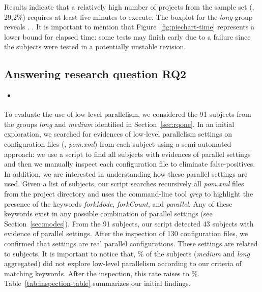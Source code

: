 Results indicate that a relatively high number of projects from the
sample set (\ie, 29,2\%) requires at least five minutes to execute.
The boxplot for the \emph{long} group reveals . .  It is important to mention that
Figure~\ref{fig:piechart-time} represents a lower bound for elapsed
time: some tests may finish early due to a failure since the subjects
were tested in a potentially unstable revision.

\subsection{Answering research question RQ2}
\label{sec:rqTwo}

\begin{itemize}
    \item \emph{\RQB}
\end{itemize}

To evaluate the  use of low-level parallelism, we considered the 91
subjects from the groups \emph{long} and \emph{medium} identified in
Section~\ref{sec:rqone}. In an initial exploration, we searched for
evidences of low-level parallelism settings on configuration files
(\ie, \emph{pom.xml}) from each subject using a semi-automated
approach: we use a script to find all subjects with evidences of
parallel settings and then we manually inspect each configuration file
to eliminate false-positives. In addition, we are interested in
understanding how these parallel settings are used. Given a list of
subjects, our script searches recursively all \emph{pom.xml} files
from the project directory and uses the command-line tool \emph{grep}
to highlight the presence of the keywords \emph{forkMode},
\emph{forkCount}, and \emph{parallel}.  Any of these keywords exist in
any possible combination of parallel settings (see
Section~\ref{sec:modes}). From the 91 subjects, our script detected 43
subjects with evidence of parallel settings. After the inspection of
130 configuration files, we confirmed that  settings are real
parallel configurations.  These settings are related to 
subjects. It is important to notice that, \% of the subjects
(\emph{medium} and \emph{long} aggregated) did not explore low-level
parallelism according to our criteria of matching keywords. After the
inspection, this rate raises to \%. 
Table~\ref{tab:inspection-table} summarizes our initial findings.

